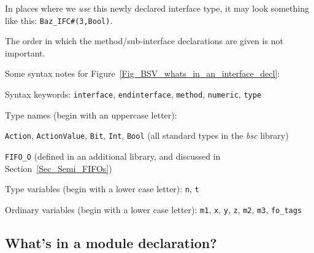 In places where we \emph{use} this newly declared interface type, it
may look something like this: \verb|Baz_IFC#(3,Bool)|.

The order in which the method/sub-interface declarations are given is
not important.

Some syntax notes for Figure~\ref{Fig_BSV_whats_in_an_interface_decl}:
\begin{tightlist}

 \item Syntax keywords: \verb|interface|, \verb|endinterface|,
       \verb|method|, \verb|numeric|, \verb|type|

 \item Type names (begin with an uppercase letter):
  \begin{tightlist}

   \item \verb|Action|, \verb|ActionValue|, \verb|Bit|, \verb|Int|,
         \verb|Bool| (all standard types in the \emph{bsc} library)

   \item \verb|FIFO_O| (defined in an additional {\BSV} library,
          and discussed in Section~\ref{Sec_Semi_FIFOs})
  \end{tightlist}

 \item Type variables (begin with a lower case letter): \verb|n|, \verb|t|

 \item Ordinary variables (begin with a lower case letter): \verb|m1|,
       \verb|x|, \verb|y|, \verb|z|, \verb|m2|, \verb|m3|,
       \verb|fo_tags|

\end{tightlist}


\subsection{What's in a module declaration?}

\label{Sec_Whats_in_a_module_declaration}


